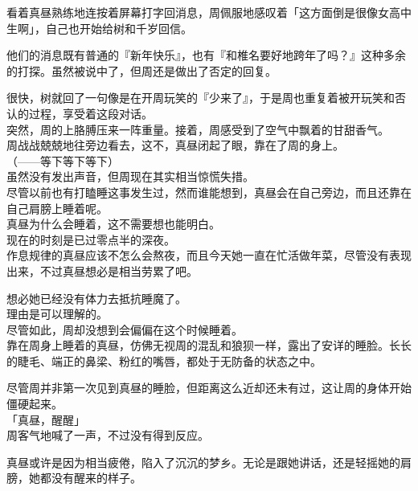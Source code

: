 看着真昼熟练地连按着屏幕打字回消息，周佩服地感叹着「这方面倒是很像女高中生啊」，自己也开始给树和千岁回信。

他们的消息既有普通的『新年快乐』，也有『和椎名要好地跨年了吗？』这种多余的打探。虽然被说中了，但周还是做出了否定的回复。

很快，树就回了一句像是在开周玩笑的『少来了』，于是周也重复着被开玩笑和否认的过程，享受着这段对话。\\

突然，周的上胳膊压来一阵重量。接着，周感受到了空气中飘着的甘甜香气。\\

周战战兢兢地往旁边看去，这不，真昼闭起了眼，靠在了周的身上。\\

（——等下等下等下）\\

虽然没有发出声音，但周现在其实相当惊慌失措。\\

尽管以前也有打瞌睡这事发生过，然而谁能想到，真昼会在自己旁边，而且还靠在自己肩膀上睡着呢。\\

真昼为什么会睡着，这不需要想也能明白。\\

现在的时刻是已过零点半的深夜。\\

作息规律的真昼应该不怎么会熬夜，而且今天她一直在忙活做年菜，尽管没有表现出来，不过真昼想必是相当劳累了吧。

想必她已经没有体力去抵抗睡魔了。\\

理由是可以理解的。\\

尽管如此，周却没想到会偏偏在这个时候睡着。\\

靠在周身上睡着的真昼，仿佛无视周的混乱和狼狈一样，露出了安详的睡脸。长长的睫毛、端正的鼻梁、粉红的嘴唇，都处于无防备的状态之中。

尽管周并非第一次见到真昼的睡脸，但距离这么近却还未有过，这让周的身体开始僵硬起来。\\

「真昼，醒醒」\\

周客气地喊了一声，不过没有得到反应。

真昼或许是因为相当疲倦，陷入了沉沉的梦乡。无论是跟她讲话，还是轻摇她的肩膀，她都没有醒来的样子。\\

